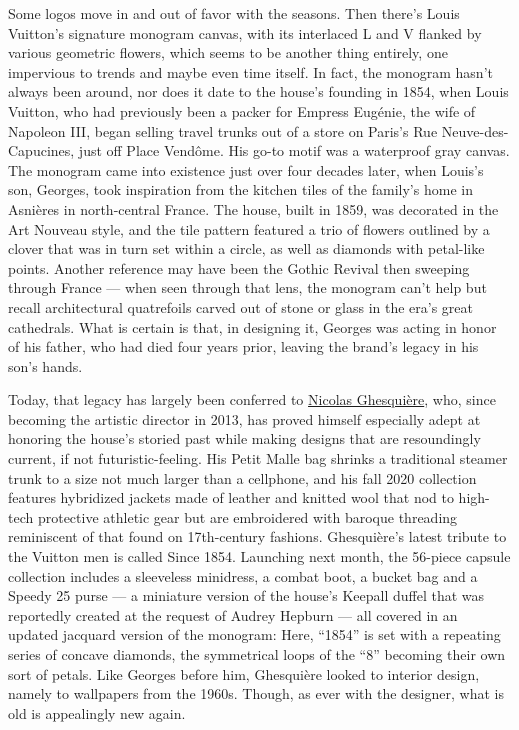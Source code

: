 Some logos move in and out of favor with the seasons. Then there's Louis
Vuitton's signature monogram canvas, with its interlaced L and V flanked
by various geometric flowers, which seems to be another thing entirely,
one impervious to trends and maybe even time itself. In fact, the
monogram hasn't always been around, nor does it date to the house's
founding in 1854, when Louis Vuitton, who had previously been a packer
for Empress Eugénie, the wife of Napoleon III, began selling travel
trunks out of a store on Paris's Rue Neuve-des-Capucines, just off Place
Vendôme. His go-to motif was a waterproof gray canvas. The monogram came
into existence just over four decades later, when Louis's son, Georges,
took inspiration from the kitchen tiles of the family's home in Asnières
in north-central France. The house, built in 1859, was decorated in the
Art Nouveau style, and the tile pattern featured a trio of flowers
outlined by a clover that was in turn set within a circle, as well as
diamonds with petal-like points. Another reference may have been the
Gothic Revival then sweeping through France --- when seen through that
lens, the monogram can't help but recall architectural quatrefoils
carved out of stone or glass in the era's great cathedrals. What is
certain is that, in designing it, Georges was acting in honor of his
father, who had died four years prior, leaving the brand's legacy in his
son's hands.

Today, that legacy has largely been conferred to
\href{https://www.nytimes3xbfgragh.onion/interactive/2019/10/15/t-magazine/nicolas-ghesquiere-louis-vuitton.html}{Nicolas
Ghesquière}, who, since becoming the artistic director in 2013, has
proved himself especially adept at honoring the house's storied past
while making designs that are resoundingly current, if not
futuristic-feeling. His Petit Malle bag shrinks a traditional steamer
trunk to a size not much larger than a cellphone, and his fall 2020
collection features hybridized jackets made of leather and knitted wool
that nod to high-tech protective athletic gear but are embroidered with
baroque threading reminiscent of that found on 17th-century fashions.
Ghesquière's latest tribute to the Vuitton men is called Since 1854.
Launching next month, the 56-piece capsule collection includes a
sleeveless minidress, a combat boot, a bucket bag and a Speedy 25 purse
--- a miniature version of the house's Keepall duffel that was
reportedly created at the request of Audrey Hepburn --- all covered in
an updated jacquard version of the monogram: Here, ``1854'' is set with
a repeating series of concave diamonds, the symmetrical loops of the
``8'' becoming their own sort of petals. Like Georges before him,
Ghesquière looked to interior design, namely to wallpapers from the
1960s. Though, as ever with the designer, what is old is appealingly new
again.

